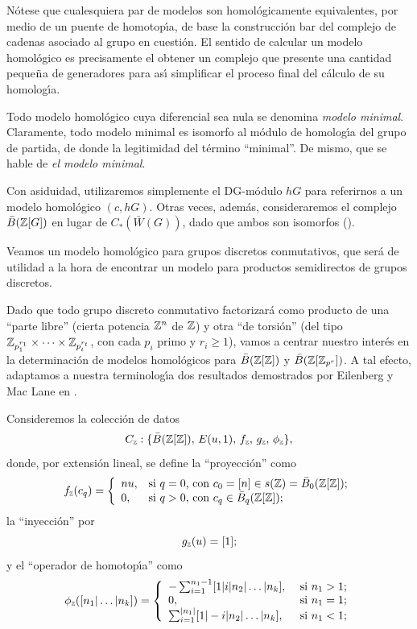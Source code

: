 N\'{o}tese que cualesquiera par de modelos son homol\'{o}gicamente
equivalentes, por medio de un puente de homotop\'{\i}a, de base la
construcci\'{o}n bar del complejo de cadenas asociado al grupo en
cuesti\'{o}n. El sentido de calcular un modelo homol\'{o}gico es
precisamente el obtener un complejo que presente una cantidad
peque${\tilde{\mbox{n}}}$a de generadores para as\'{\i} simplificar el proceso
final del c\'{a}lculo de su homolog\'{\i}a.

Todo modelo homol\'{o}gico cuya diferencial sea nula se denomina
{\em modelo minimal}. Claramente, todo modelo minimal es isomorfo
al m\'{o}dulo de homolog\'{\i}a del grupo de partida, de donde la
legitimidad del t\'{e}rmino ``minimal''. De mismo, que se hable de
{\em el modelo minimal}.

Con asiduidad, utilizaremos simplemente el DG-m\'{o}dulo $hG$ para
referirnos a un modelo homol\'{o}gico $(c,hG)$. Otras veces,
adem\'{a}s, consideraremos el complejo $\bar{B}({\Bbb Z}[G])$ en lugar de
$C_*(\bar{W}(G))$, dado que ambos son isomorfos (\cite{EM53}).

Veamos un modelo homol\'{o}gico para grupos discretos conmutativos,
que ser\'{a} de utilidad a la hora de encontrar un modelo para
productos semidirectos de grupos discretos.

Dado que todo grupo discreto conmutativo factorizar\'{a} como
producto de una ``parte libre'' (cierta potencia ${\Bbb Z}^n$ de ${\Bbb Z}$) y
otra ``de torsi\'{o}n'' (del tipo ${\Bbb Z}_{p_1^{r_1}} \times \cdots
\times {\Bbb Z}_{p_t^{r_t}}$, con cada $p_i$ primo y $r_i \geq 1$),
vamos a centrar nuestro inter\'{e}s en la determinaci\'{o}n de modelos
homol\'{o}gicos para $\bar{B}({\Bbb Z} [{\Bbb Z}])$ y $\bar{B}({\Bbb Z} [{\Bbb Z} _{p^r}])$.
A tal efecto, adaptamos a nuestra terminolog\'{\i}a dos resultados
demostrados por Eilenberg y Mac Lane en \cite{EM54}.

Consideremos la colecci\'{o}n de datos $$C_{\scriptscriptstyle {{\Bbb Z}}}:\{ \bar{B}
({\Bbb Z}[{{\Bbb Z}}]),\,\mbox{$E(u,1), \, f_{\scriptscriptstyle {{\Bbb Z}}}, \, g_{\scriptscriptstyle {{\Bbb Z}}},
\, \phi_{\scriptscriptstyle {{\Bbb Z}}}$}\},$$ donde, por extensi\'{o}n lineal, se
define la ``proyecci\'{o}n'' como $$f_{\scriptscriptstyle {{\Bbb Z}}}(c_q) = \left\{
\begin{array}{ll} nu, & \mbox{si $q=0$, con $c_0=[n] \in
s( {{\Bbb Z}} )= \bar{B}_0({\Bbb Z}[{\Bbb Z}]);$}\\ 0, & \mbox{si $q>0$, con $c_q \in
\bar{B}_q({\Bbb Z}[{\Bbb Z}])$;} \end{array} \right.$$ la ``inyecci\'{o}n'' por
$$g_{\scriptscriptstyle {{\Bbb Z}}}(u)=[1];$$ y el ``operador de homotop\'{\i}a''
como $$\phi_{\scriptscriptstyle {{\Bbb Z}}}([n_1 \vert \ldots \vert n_k]) = \left\{
\begin{array}{ll} -\sum_{i=1}^{n_1 -1} [1\vert i \vert n_2 \vert
\ldots \vert n_k], & \mbox{ si $n_1
>1$;} \\ 0, & \mbox{ si $n_1 = 1$;} \\ \sum_{i=1}^{\vert n_1
\vert} [1 \vert -i \vert n_2 \vert \ldots \vert n_k], & \mbox{ si
$n_1 < 1$;}
\end{array} \right.$$


